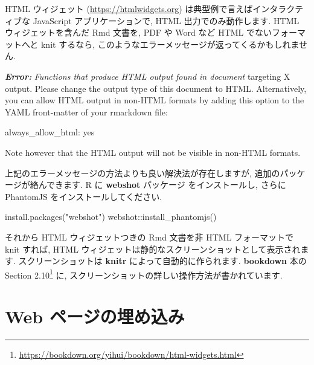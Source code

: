 \documentclass[
  11pt,
]{bxjsreport}
\newenvironment{Shaded}{\begin{snugshade}}{\end{snugshade}}
\newcommand{\AnnotationTok}[1]{\textcolor[rgb]{0.56,0.35,0.01}{\textbf{\textit{#1}}}}
\newcommand{\CommentTok}[1]{\textcolor[rgb]{0.56,0.35,0.01}{\textit{#1}}}
\newcommand{\FunctionTok}[1]{\textcolor[rgb]{0.00,0.00,0.00}{#1}}
\newcommand{\NormalTok}[1]{#1}
\newcommand{\SpecialCharTok}[1]{\textcolor[rgb]{0.00,0.00,0.00}{#1}}
\newcommand{\StringTok}[1]{\textcolor[rgb]{0.31,0.60,0.02}{#1}}
\renewcommand{\href}[2]{#2\footnote{\url{#1}}}
\begin{document}
HTML ウィジェット (\url{https://htmlwidgets.org}) は典型例で言えばインタラクティブな JavaScript アプリケーションで, HTML 出力でのみ動作します. HTML ウィジェットを含んだ Rmd 文書を, PDF や Word など HTML でないフォーマットへと knit するなら, このようなエラーメッセージが返ってくるかもしれません.

\begin{Shaded}
\begin{Highlighting}[]
\AnnotationTok{Error:}\CommentTok{ Functions that produce HTML output found in document}
\NormalTok{targeting X output. Please change the output type of this}
\NormalTok{document to HTML. Alternatively, you can allow HTML output in}
\NormalTok{non{-}HTML formats by adding this option to the YAML front{-}matter}
\NormalTok{of your rmarkdown file:}

\NormalTok{  always\_allow\_html: yes}

\NormalTok{Note however that the HTML output will not be visible in}
\NormalTok{non{-}HTML formats.}
\end{Highlighting}
\end{Shaded}

上記のエラーメッセージの方法よりも良い解決法が存在しますが, 追加のパッケージが絡んできます. R に \textbf{webshot} パッケージ\autocite{R-webshot} をインストールし, さらに PhantomJS をインストールしてください.

\begin{Shaded}
\begin{Highlighting}[numbers=left,,]
\FunctionTok{install.packages}\NormalTok{(}\StringTok{"webshot"}\NormalTok{)}
\NormalTok{webshot}\SpecialCharTok{::}\FunctionTok{install\_phantomjs}\NormalTok{()}
\end{Highlighting}
\end{Shaded}

それから HTML ウィジェットつきの Rmd 文書を非 HTML フォーマットで knit すれば, HTML ウィジェットは静的なスクリーンショットとして表示されます. スクリーンショットは \textbf{knitr} によって自動的に作られます. \textbf{bookdown} 本の \href{https://bookdown.org/yihui/bookdown/html-widgets.html}{Section 2.10} に, スクリーンショットの詳しい操作方法が書かれています.

\hypertarget{include-url}{%
\section{Web ページの埋め込み}\label{include-url}}
\end{document}
